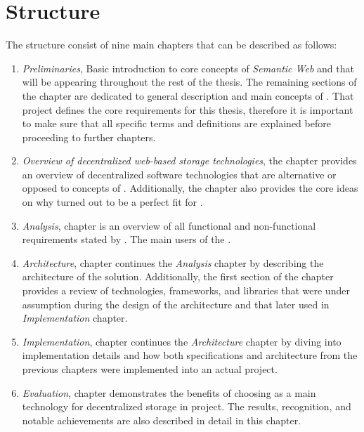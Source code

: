 \section*{Structure}

The structure consist of nine main chapters that can be described as follows:
\begin{enumerate}
    \item \textit{Preliminaries}, Basic introduction to core concepts of \textit{Semantic Web} and \solid{} that will be appearing throughout the rest of the thesis. The remaining sections of the chapter are dedicated to general description and main concepts of \lpa{}. That project defines the core requirements for this thesis, therefore it is important to make sure that all \lpa{} specific terms and definitions are explained before proceeding to further chapters.
    
    \item \textit{Overview of decentralized web-based storage technologies}, the chapter provides an overview of decentralized software technologies that are alternative or opposed to concepts of \solid{}. Additionally, the chapter also provides the core ideas on why \solid{} turned out to be a perfect fit for \lpa{}.

    \item \textit{Analysis}, chapter is an overview of all functional and non-functional requirements stated by \lpa{}. The main users of the \lpas{}.

    \item \textit{Architecture}, chapter continues the \textit{Analysis} chapter by describing the architecture of the solution. Additionally, the first section of the chapter provides a review of technologies, frameworks, and libraries that were under assumption during the design of the architecture and that later used in \textit{Implementation} chapter.  

    \item \textit{Implementation}, chapter continues the \textit{Architecture} chapter by diving into implementation details and how both specifications and architecture from the previous chapters were implemented into an actual project. 
    
    \item \textit{Evaluation}, chapter demonstrates the benefits of choosing \solid{} as a main technology for decentralized storage in \lpa{} project. The results, recognition, and notable achievements are also described in detail in this chapter.
    

\end{enumerate}
